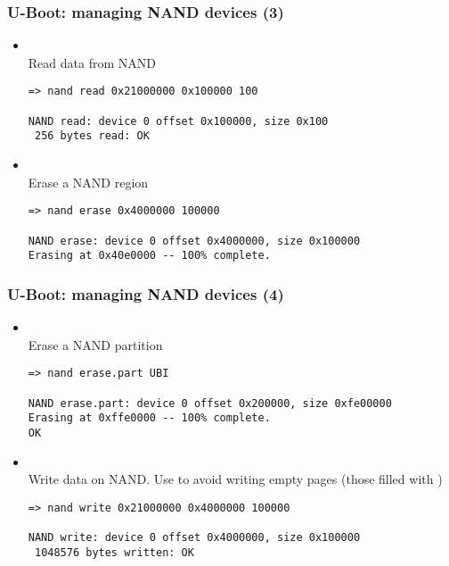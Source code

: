 \begin{frame}[fragile]
  \frametitle{U-Boot: managing NAND devices (3)}
  \begin{itemize}
  \item {}\\
    Read data from NAND
    \begin{block}{}
    \footnotesize
    \begin{verbatim}
=> nand read 0x21000000 0x100000 100

NAND read: device 0 offset 0x100000, size 0x100
 256 bytes read: OK
    \end{verbatim}
    \end{block}
  \item {}\\
    Erase a NAND region
    \begin{block}{}
    \footnotesize
    \begin{verbatim}
=> nand erase 0x4000000 100000

NAND erase: device 0 offset 0x4000000, size 0x100000
Erasing at 0x40e0000 -- 100% complete.
    \end{verbatim}
    \end{block}
  \end{itemize}
\end{frame}

\begin{frame}[fragile]
  \frametitle{U-Boot: managing NAND devices (4)}
  \begin{itemize}
  \item {}\\
    Erase a NAND partition
    \begin{block}{}
    \footnotesize
    \begin{verbatim}
=> nand erase.part UBI

NAND erase.part: device 0 offset 0x200000, size 0xfe00000
Erasing at 0xffe0000 -- 100% complete.
OK
    \end{verbatim}
    \end{block}
  \item {}\\
    Write data on NAND. Use  to avoid writing empty pages
    (those filled with )
    \begin{block}{}
    \footnotesize
    \begin{verbatim}
=> nand write 0x21000000 0x4000000 100000

NAND write: device 0 offset 0x4000000, size 0x100000
 1048576 bytes written: OK
    \end{verbatim}
    \end{block}
  \end{itemize}
\end{frame}

